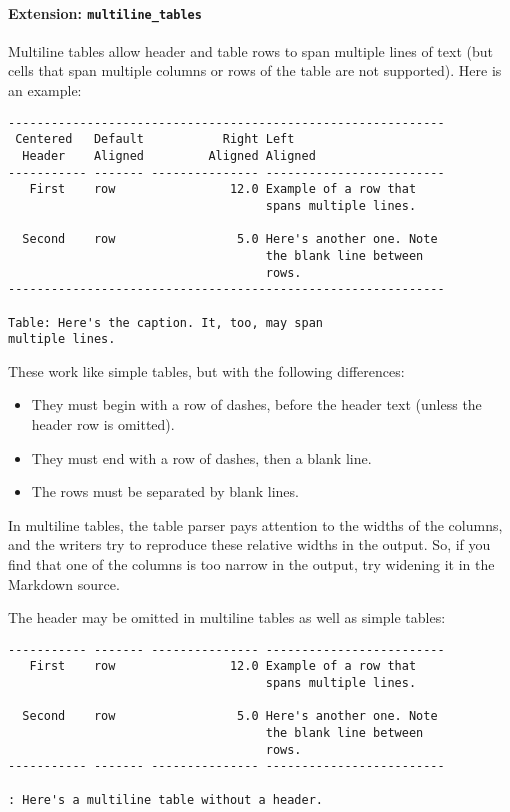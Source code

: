 \documentclass[
]{article}
\providecommand{\tightlist}{%
  \setlength{\itemsep}{0pt}\setlength{\parskip}{0pt}}
\begin{document}
\paragraph{\texorpdfstring{Extension:
\texttt{multiline\_tables}}{Extension: multiline\_tables}}\label{extension-multiline_tables}

Multiline tables allow header and table rows to span multiple lines of
text (but cells that span multiple columns or rows of the table are not
supported). Here is an example:

\begin{verbatim}
-------------------------------------------------------------
 Centered   Default           Right Left
  Header    Aligned         Aligned Aligned
----------- ------- --------------- -------------------------
   First    row                12.0 Example of a row that
                                    spans multiple lines.

  Second    row                 5.0 Here's another one. Note
                                    the blank line between
                                    rows.
-------------------------------------------------------------

Table: Here's the caption. It, too, may span
multiple lines.
\end{verbatim}

These work like simple tables, but with the following differences:

\begin{itemize}
\tightlist
\item
  They must begin with a row of dashes, before the header text (unless
  the header row is omitted).
\item
  They must end with a row of dashes, then a blank line.
\item
  The rows must be separated by blank lines.
\end{itemize}

In multiline tables, the table parser pays attention to the widths of
the columns, and the writers try to reproduce these relative widths in
the output. So, if you find that one of the columns is too narrow in the
output, try widening it in the Markdown source.

The header may be omitted in multiline tables as well as simple tables:

\begin{verbatim}
----------- ------- --------------- -------------------------
   First    row                12.0 Example of a row that
                                    spans multiple lines.

  Second    row                 5.0 Here's another one. Note
                                    the blank line between
                                    rows.
----------- ------- --------------- -------------------------

: Here's a multiline table without a header.
\end{verbatim}
\end{document}
